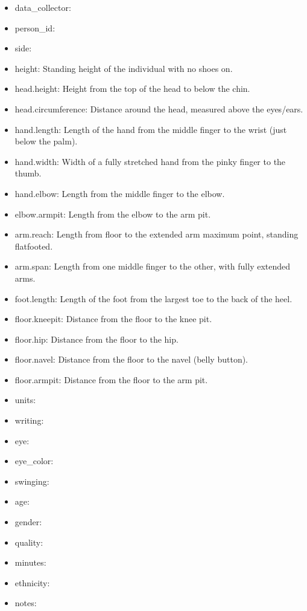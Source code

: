\documentclass[]{article}
\providecommand{\tightlist}{%
\setlength{\itemsep}{0pt}\setlength{\parskip}{0pt}}
\begin{document}
\begin{itemize}
\tightlist
\item
  data\_collector:
\item
  person\_id:
\item
  side:
\item
  height: Standing height of the individual with no shoes on.
\item
  head.height: Height from the top of the head to below the chin.
\item
  head.circumference: Distance around the head, measured above the
  eyes/ears.
\item
  hand.length: Length of the hand from the middle finger to the wrist
  (just below the palm).
\item
  hand.width: Width of a fully stretched hand from the pinky finger to
  the thumb.
\item
  hand.elbow: Length from the middle finger to the elbow.
\item
  elbow.armpit: Length from the elbow to the arm pit.
\item
  arm.reach: Length from floor to the extended arm maximum point,
  standing flatfooted.
\item
  arm.span: Length from one middle finger to the other, with fully
  extended arms.
\item
  foot.length: Length of the foot from the largest toe to the back of
  the heel.
\item
  floor.kneepit: Distance from the floor to the knee pit.
\item
  floor.hip: Distance from the floor to the hip.
\item
  floor.navel: Distance from the floor to the navel (belly button).
\item
  floor.armpit: Distance from the floor to the arm pit.
\item
  units:
\item
  writing:
\item
  eye:
\item
  eye\_color:
\item
  swinging:
\item
  age:
\item
  gender:
\item
  quality:
\item
  minutes:
\item
  ethnicity:
\item
  notes:
\end{itemize}

\newpage
\end{document}
